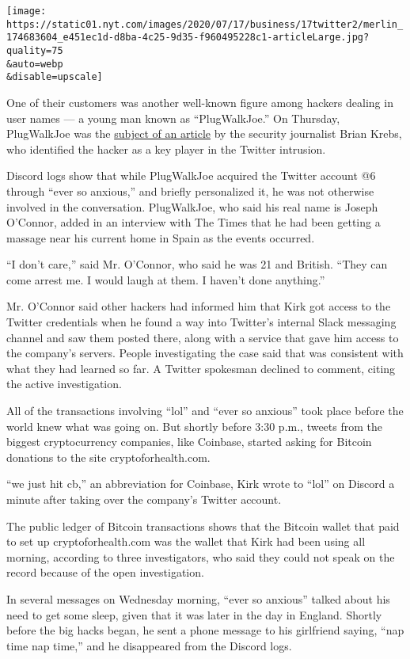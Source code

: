 \texttt{[image: https://static01.nyt.com/images/2020/07/17/business/17twitter2/merlin\_174683604\_e451ec1d-d8ba-4c25-9d35-f960495228c1-articleLarge.jpg?quality=75\\\&auto=webp\\\&disable=upscale]}

One of their customers was another well-known figure among hackers
dealing in user names --- a young man known as ``PlugWalkJoe.'' On
Thursday, PlugWalkJoe was the
\href{https://krebsonsecurity.com/2020/07/whos-behind-wednesdays-epic-twitter-hack/}{subject
of an article} by the security journalist Brian Krebs, who identified
the hacker as a key player in the Twitter intrusion.

Discord logs show that while PlugWalkJoe acquired the Twitter account @6
through ``ever so anxious,'' and briefly personalized it, he was not
otherwise involved in the conversation. PlugWalkJoe, who said his real
name is Joseph O'Connor, added in an interview with The Times that he
had been getting a massage near his current home in Spain as the events
occurred.

``I don't care,'' said Mr. O'Connor, who said he was 21 and British.
``They can come arrest me. I would laugh at them. I haven't done
anything.''

Mr. O'Connor said other hackers had informed him that Kirk got access to
the Twitter credentials when he found a way into Twitter's internal
Slack messaging channel and saw them posted there, along with a service
that gave him access to the company's servers. People investigating the
case said that was consistent with what they had learned so far. A
Twitter spokesman declined to comment, citing the active investigation.

All of the transactions involving ``lol'' and ``ever so anxious'' took
place before the world knew what was going on. But shortly before 3:30
p.m., tweets from the biggest cryptocurrency companies, like Coinbase,
started asking for Bitcoin donations to the site cryptoforhealth.com.

``we just hit cb,'' an abbreviation for Coinbase, Kirk wrote to ``lol''
on Discord a minute after taking over the company's Twitter account.

The public ledger of Bitcoin transactions shows that the Bitcoin wallet
that paid to set up cryptoforhealth.com was the wallet that Kirk had
been using all morning, according to three investigators, who said they
could not speak on the record because of the open investigation.

In several messages on Wednesday morning, ``ever so anxious'' talked
about his need to get some sleep, given that it was later in the day in
England. Shortly before the big hacks began, he sent a phone message to
his girlfriend saying, ``nap time nap time,'' and he disappeared from
the Discord logs.

